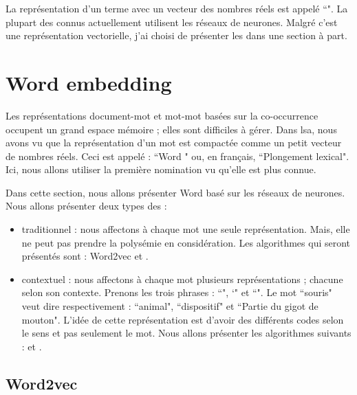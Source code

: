 \documentclass{KodeBook}
\begin{document}
La représentation d'un terme avec un vecteur des nombres réels est appelé ``". 
La plupart des  connus actuellement utilisent les réseaux de neurones. 
Malgré c'est une représentation vectorielle, j'ai choisi de présenter les  dans une section à part.

\section{Word embedding}

Les représentations document-mot et mot-mot basées sur la co-occurrence occupent un grand espace mémoire ; elles sont difficiles à gérer.
Dans \ac{lsa}, nous avons vu que la représentation d'un mot est compactée comme un petit vecteur de nombres réels.
Ceci est appelé : ``Word " ou, en français, ``Plongement lexical". 
Ici, nous allons utiliser la première nomination vu qu'elle est plus connue.

Dans cette section, nous allons présenter Word  basé sur les réseaux de neurones. 
Nous allons présenter deux types des  : 
\begin{itemize}
	\item traditionnel : nous affectons à chaque mot une seule représentation. 
	Mais, elle ne peut pas prendre la polysémie en considération. 
	Les algorithmes qui seront présentés sont : Word2vec et .
	\item contextuel : nous affectons à  chaque mot plusieurs représentations ; chacune selon son contexte.
	Prenons les trois phrases : 
	``", 
	`" et 
	``".
	Le mot ``souris" veut dire respectivement : ``animal", ``dispositif" et ``Partie du gigot de mouton". 
	L'idée de cette représentation est d'avoir des différents codes selon le sens et pas seulement le mot. 
	Nous allons présenter les algorithmes suivants :  et .
\end{itemize} 

\subsection{Word2vec}
\end{document}
